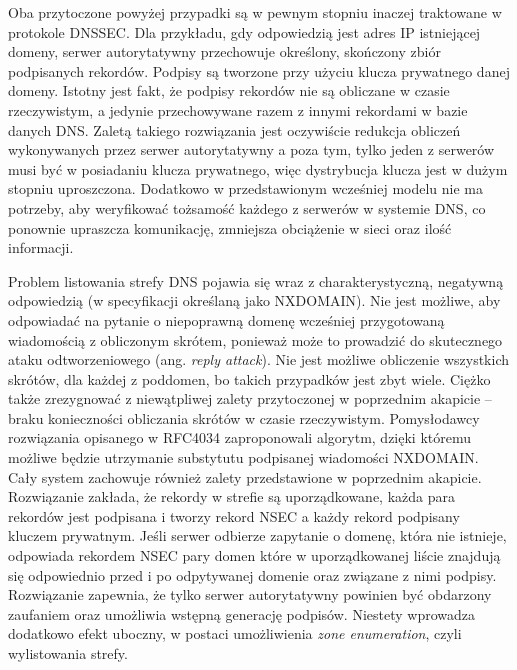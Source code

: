 Oba przytoczone powyżej przypadki są w pewnym stopniu inaczej traktowane w protokole DNSSEC. Dla przykładu, gdy odpowiedzią jest
adres IP istniejącej domeny, serwer autorytatywny przechowuje określony, skończony zbiór podpisanych rekordów. Podpisy są tworzone
przy użyciu klucza prywatnego danej domeny. Istotny jest fakt, że podpisy rekordów nie są obliczane w czasie rzeczywistym, a jedynie
przechowywane razem z innymi rekordami w bazie danych DNS. Zaletą takiego rozwiązania jest oczywiście redukcja obliczeń wykonywanych
przez serwer autorytatywny a poza tym, tylko jeden z serwerów musi być w posiadaniu klucza prywatnego, więc dystrybucja klucza jest w
dużym stopniu uproszczona. Dodatkowo w przedstawionym wcześniej modelu nie ma potrzeby, aby weryfikować tożsamość każdego z serwerów
w systemie DNS, co ponownie upraszcza komunikację, zmniejsza obciążenie w sieci oraz ilość informacji.

Problem listowania strefy DNS pojawia się wraz z charakterystyczną, negatywną odpowiedzią (w specyfikacji określaną jako NXDOMAIN).
Nie jest możliwe, aby odpowiadać na pytanie o niepoprawną domenę wcześniej przygotowaną wiadomością z obliczonym skrótem, ponieważ
może to prowadzić do skutecznego ataku odtworzeniowego (ang. \textit{reply attack}). Nie jest możliwe obliczenie wszystkich skrótów,
dla każdej z poddomen, bo takich przypadków jest zbyt wiele. Ciężko także zrezygnować z niewątpliwej zalety przytoczonej w poprzednim
akapicie -- braku konieczności obliczania skrótów w czasie rzeczywistym. Pomysłodawcy rozwiązania opisanego w RFC4034\cite{RFC4034}
zaproponowali algorytm, dzięki któremu możliwe będzie utrzymanie substytutu podpisanej wiadomości NXDOMAIN. Cały system zachowuje
również zalety przedstawione w poprzednim akapicie. Rozwiązanie zakłada, że rekordy w strefie są uporządkowane, każda para rekordów
jest podpisana i tworzy rekord NSEC a każdy rekord podpisany kluczem prywatnym. Jeśli serwer odbierze zapytanie o domenę, która
nie istnieje, odpowiada rekordem NSEC pary domen które w uporządkowanej liście znajdują się odpowiednio przed i po odpytywanej
domenie oraz związane z nimi podpisy. Rozwiązanie zapewnia, że tylko serwer autorytatywny powinien być obdarzony zaufaniem oraz
umożliwia wstępną generację podpisów. Niestety wprowadza dodatkowo efekt uboczny, w postaci umożliwienia \textit{zone enumeration},
czyli wylistowania strefy.

